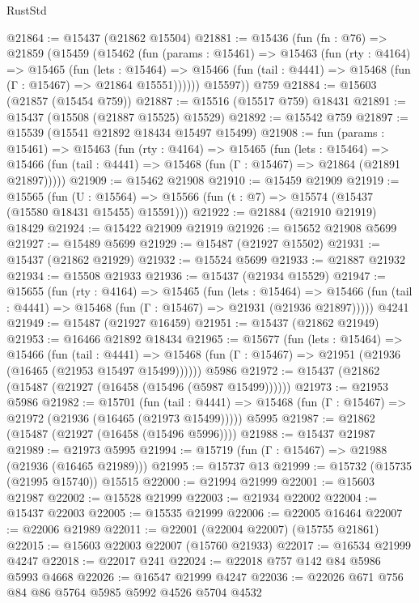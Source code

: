 \begin{lexlean}{RustStd}
\begin{coremodule}
@21864 := @15437 (@21862 @15504)
@21881 := @15436
    (fun (fn : @76) =>
    @21859
      (@15459
        (@15462
          (fun (params : @15461) =>
          @15463
            (fun (rty : @4164) =>
            @15465
              (fun (lets : @15464) =>
              @15466 (fun (tail : @4441) => @15468 (fun (Γ : @15467) => @21864 @15551))))))
        @15597))
    @759
@21884 := @15603 (@21857 (@15454 @759))
@21887 := @15516 (@15517 @759) @18431
@21891 := @15437 (@15508 (@21887 @15525) @15529)
@21892 := @15542 @759
@21897 := @15539 (@15541 @21892 @18434 @15497 @15499)
@21908 := fun (params : @15461) =>
  @15463
    (fun (rty : @4164) =>
    @15465
      (fun (lets : @15464) =>
      @15466 (fun (tail : @4441) => @15468 (fun (Γ : @15467) => @21864 (@21891 @21897)))))
@21909 := @15462 @21908
@21910 := @15459 @21909
@21919 := @15565
    (fun (U : @15564) => @15566 (fun (t : @7) => @15574 (@15437 (@15580 @18431 @15455) @15591)))
@21922 := @21884 (@21910 @21919) @18429
@21924 := @15422 @21909 @21919
@21926 := @15652 @21908 @5699
@21927 := @15489 @5699
@21929 := @15487 (@21927 @15502)
@21931 := @15437 (@21862 @21929)
@21932 := @15524 @5699
@21933 := @21887 @21932
@21934 := @15508 @21933
@21936 := @15437 (@21934 @15529)
@21947 := @15655
    (fun (rty : @4164) =>
    @15465
      (fun (lets : @15464) =>
      @15466 (fun (tail : @4441) => @15468 (fun (Γ : @15467) => @21931 (@21936 @21897)))))
    @4241
@21949 := @15487 (@21927 @16459)
@21951 := @15437 (@21862 @21949)
@21953 := @16466 @21892 @18434
@21965 := @15677
    (fun (lets : @15464) =>
    @15466
      (fun (tail : @4441) =>
      @15468 (fun (Γ : @15467) => @21951 (@21936 (@16465 (@21953 @15497 @15499))))))
    @5986
@21972 := @15437 (@21862 (@15487 (@21927 (@16458 (@15496 (@5987 @15499))))))
@21973 := @21953 @5986
@21982 := @15701
    (fun (tail : @4441) => @15468 (fun (Γ : @15467) => @21972 (@21936 (@16465 (@21973 @15499)))))
    @5995
@21987 := @21862 (@15487 (@21927 (@16458 (@15496 @5996))))
@21988 := @15437 @21987
@21989 := @21973 @5995
@21994 := @15719 (fun (Γ : @15467) => @21988 (@21936 (@16465 @21989)))
@21995 := @15737 @13
@21999 := @15732 (@15735 (@21995 @15740)) @15515
@22000 := @21994 @21999
@22001 := @15603 @21987
@22002 := @15528 @21999
@22003 := @21934 @22002
@22004 := @15437 @22003
@22005 := @15535 @21999
@22006 := @22005 @16464
@22007 := @22006 @21989
@22011 := @22001 (@22004 @22007) (@15755 @21861)
@22015 := @15603 @22003 @22007 (@15760 @21933)
@22017 := @16534 @21999 @4247
@22018 := @22017 @241
@22024 := @22018 @757 @142 @84 @5986 @5993 @4668
@22026 := @16547 @21999 @4247
@22036 := @22026 @671 @756 @84 @86 @5764 @5985 @5992 @4526 @5704 @4532

\end{coremodule}
\end{lexlean}

